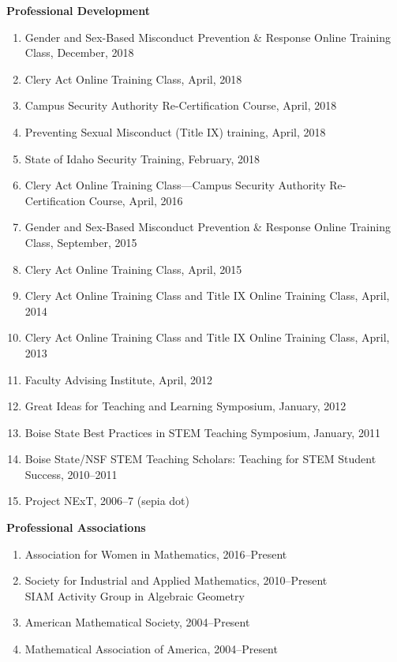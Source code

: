 \documentclass[12pt]{article}
\begin{document}
\textbf{Professional Development}
\begin{enumerate}
\item Gender and Sex-Based Misconduct Prevention \& Response Online Training Class, December, 2018
\item Clery Act Online Training Class, April, 2018
\item Campus Security Authority Re-Certification Course, April, 2018
\item Preventing Sexual Misconduct (Title IX) training, April, 2018
\item State of Idaho Security Training, February, 2018
\item Clery Act Online Training Class---Campus Security Authority Re-Certification Course, April, 2016
\item Gender and Sex-Based Misconduct Prevention \& Response Online Training Class, September, 2015
\item Clery Act Online Training Class, April, 2015
\item Clery Act Online Training Class and Title IX Online Training Class, April, 2014
\item Clery Act Online Training Class and Title IX Online Training Class, April, 2013
\item Faculty Advising Institute, April, 2012
\item Great Ideas for Teaching and Learning Symposium, January, 2012
\item Boise State Best Practices in STEM Teaching Symposium, January, 2011
\item Boise State/NSF STEM Teaching Scholars: Teaching for STEM Student Success, 2010--2011
\item Project NExT, 2006--7 (sepia dot)%
\end{enumerate}




\textbf{Professional Associations}
\begin{enumerate}
\item Association for Women in Mathematics, 2016--Present
\item Society for Industrial and Applied Mathematics, 2010--Present \\ SIAM Activity Group in Algebraic Geometry
\item American Mathematical Society, 2004--Present
\item Mathematical Association of America, 2004--Present
\end{enumerate}
\end{document}
